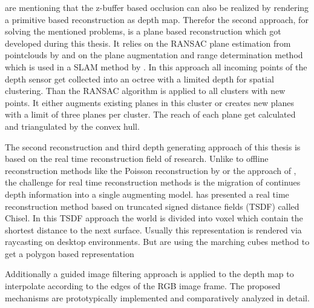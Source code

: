 \documentclass[12pt]{support/thcolognereport}
\begin{document}
\citet{breen1996interactive} are mentioning that the z-buffer based occlusion can also be realized by rendering a primitive based reconstruction as depth map. Therefor the second approach, for solving the mentioned problems, is a plane based reconstruction which got developed during this thesis. It relies on the RANSAC plane estimation from pointclouds by \citet{yang2010plane} and on the plane augmentation and range determination method which is used in a SLAM method by \citet{trevor2012planar}. In this approach all incoming points of the depth sensor get collected into an octree with a limited depth for spatial clustering. Than the RANSAC algorithm is applied to all clusters with new points. It either augments existing planes in this cluster or creates new planes with a limit of three planes per cluster. The reach of each plane get calculated and triangulated by the convex hull. 

The second reconstruction and third depth generating approach of this thesis is based on the real time reconstruction field of research. Unlike to offline reconstruction methods like the Poisson reconstruction by \citet{kazhdan2006poisson} or the approach of \citet{hoppe1992surface}, the challenge for real time reconstruction methods is the migration of continues depth information into a single augmenting model. \citet{Klingensmith_2015_7924} has presented a real time reconstruction method based on truncated signed distance fields (TSDF) called Chisel. In this TSDF approach the world is divided into voxel which contain the shortest distance to the next surface. Usually this representation is rendered via raycasting on desktop environments. But \citet{Klingensmith_2015_7924} are using the marching cubes method to get a polygon based representation 


Additionally a guided image filtering approach is applied to the depth map to interpolate according to the edges of the RGB image frame. The proposed mechanisms are prototypically implemented and comparatively analyzed in detail.


\setlength{\parskip}{0em}



 
\end{document}
